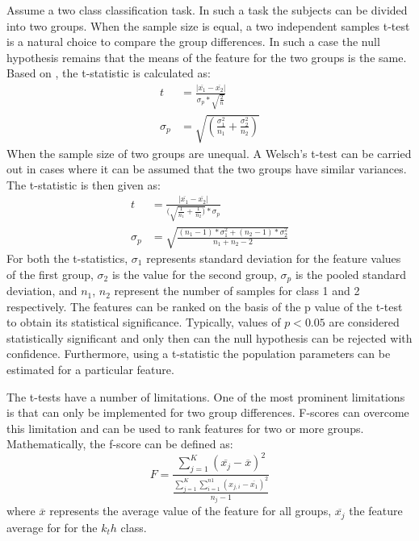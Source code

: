 \documentclass[msthesis.tex]{subfiles}
\begin{document}
Assume a two class classification task. In such a task the subjects can be divided into two groups. When the sample size is equal, a two independent samples t-test is a natural choice to compare the group differences. In such a case the null hypothesis remains that the means of the feature for the two groups is the same. Based on \cite{inza2004filter}, the t-statistic is calculated as:
\begin{align}
        \label{eqn:tstat ind}
       t &= \frac{|\overline{x_1} - \overline{x_2}|}{\sigma_{p}*\sqrt{\frac{2}{n}}} \\
       \sigma_p &= {\sqrt{(\frac{\sigma_{1}^2 }{n_{1}}+ \frac{\sigma_{2}^2}{n_{2}})}}
\end{align}
When the sample size of two groups are unequal. A Welsch's t-test can be carried out in cases where it can be assumed that the two groups have similar variances. The t-statistic is then given as:  
\begin{align}
    \label{eqn:tstat welsch}
    t &= \frac{|\overline{x_1} - \overline{x_2}|}{(\sqrt{\frac{1}{n_{1}}+\frac{1}{n_{2}})}*\sigma_p} \\
    \sigma_p &= \sqrt{\frac{(n_{1} -1) * \sigma_1^2 + (n_{2}-1) * \sigma_2^2}{n_{1} + n_{2} -2}}  
\end{align}
For both the t-statistics, $\sigma_{1}$ represents standard deviation for the feature values of the first group, $\sigma_{2}$ is the value for the second group, $\sigma_p$ is the pooled standard deviation, and $n_{1}$, $n_{2}$ represent the number of samples for class 1 and 2 respectively. The features can be ranked on the basis of the p value of the t-test to obtain its statistical significance. Typically, values of $p<0.05$ are considered statistically significant \citep{colquhoun2017reproducibility} and only then can the null hypothesis can be rejected with confidence. Furthermore, using a t-statistic the population parameters can be estimated for a particular feature. 

The t-tests have a number of limitations. One of the most prominent limitations is that can only be implemented for two group differences. F-scores can overcome this limitation and can be used to rank features for two or more groups. Mathematically, the f-score can be defined as: 
\begin{equation}
\label{eq:fscores}
    F = \frac{\sum_{j=1}^{K}(\overline{x_{j}} - \overline{x})^2 }
    {\frac{\sum_{j=1}^{K}\sum_{i=1}^{n1}(x_{j,i} - \overline{x_{1}})^2}{n_{j} -1}}
\end{equation}
where $\overline{x}$ represents the average value of the feature for all groups, $\overline{x_{j}}$ the feature average for for the $k_th$ class.
\end{document}
